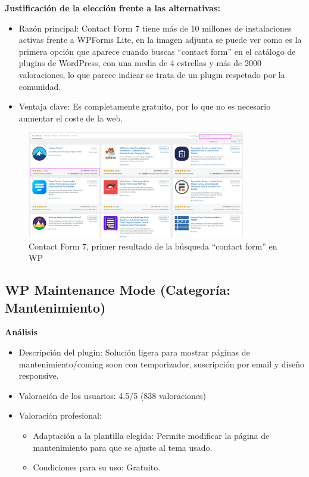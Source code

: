 \documentclass[a4paper]{article}
\begin{document}
\textbf{Justificación de la elección frente a las alternativas:}
\begin{itemize}
    \item Razón principal: Contact Form 7 tiene más de 10 millones de instalaciones activas frente a WPForms Lite, en la imagen adjunta se puede ver como es la primera opción que aparece cuando buscas ``contact form'' en el catálogo de plugins de WordPress, con una media de 4 estrellas y más de 2000 valoraciones, lo que parece indicar se trata de un plugin respetado por la comunidad.
    \item Ventaja clave: Es completamente gratuito, por lo que no es necesario aumentar el coste de la web.
\end{itemize}

\begin{figure}[H]
    \centering
    \includegraphics[width=0.85\textwidth]{images/popularidad-contact-form-7.png}
    \caption{Contact Form 7, primer resultado  de la búsqueda ``contact form'' en WP}
\end{figure}


\subsection{WP Maintenance Mode (Categoría: Mantenimiento)}

\textbf{Análisis}
\begin{itemize}
    \item Descripción del plugin: Solución ligera para mostrar páginas de mantenimiento/coming soon con temporizador, suscripción por email y diseño responsive.
    \item Valoración de los usuarios: 4.5/5 (838 valoraciones)
    \item Valoración profesional:
    \begin{itemize}
        \item Adaptación a la plantilla elegida: Permite modificar la página de mantenimiento para que se ajuste al tema usado.
        \item Condiciones para su uso: Gratuito.
    \end{itemize}
\end{itemize}
\end{document}
